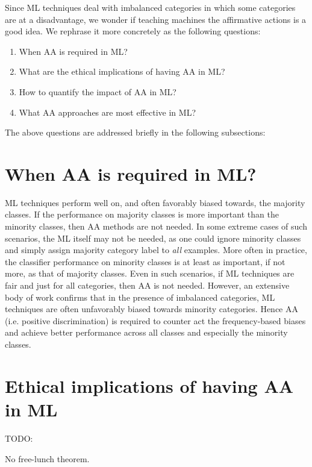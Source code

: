 Since ML techniques deal with imbalanced categories in which some categories are at a disadvantage, we wonder if teaching machines the affirmative actions is a good idea.
We rephrase it more concretely as the following questions: 
\begin{enumerate}
    \item When AA is required in ML?
    \item What are the ethical implications of having AA in ML?
    \item How to quantify the impact of AA in ML?
    \item What AA approaches are most effective in ML?
\end{enumerate}

The above questions are addressed briefly in the following subsections:

\section{When AA is required in ML?}
ML techniques perform well on, and often favorably biased towards, the majority classes. 
If the performance on majority classes is more important than the minority classes, then AA methods are not needed.
In some extreme cases of such scenarios, the ML itself may not be needed, as one could  ignore minority classes and simply assign majority category label to \textit{all} examples.
More often in practice, the classifier performance on minority classes is at least as important, if not more, as that of majority classes.
Even in such scenarios, if ML techniques are fair and just for all categories, then AA is not needed. 
However, an extensive body of work confirms that in the presence of imbalanced categories, ML techniques are often unfavorably biased towards minority categories.
Hence AA (i.e. positive discrimination) is required to counter act the frequency-based biases and achieve better performance across all classes and especially the minority classes. 

\section{Ethical implications of having AA in ML}
TODO:

No free-lunch theorem.


